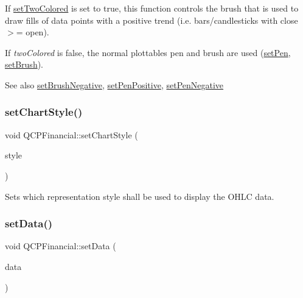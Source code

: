 If \mbox{\hyperlink{class_q_c_p_financial_a138e44aac160a17a9676652e240c5f08}{set\+Two\+Colored}} is set to true, this function controls the brush that is used to draw fills of data points with a positive trend (i.\+e. bars/candlesticks with close $>$= open).

If {\itshape two\+Colored} is false, the normal plottable\textquotesingle{}s pen and brush are used (\mbox{\hyperlink{class_q_c_p_abstract_plottable_ab74b09ae4c0e7e13142fe4b5bf46cac7}{set\+Pen}}, \mbox{\hyperlink{class_q_c_p_abstract_plottable_a7a4b92144dca6453a1f0f210e27edc74}{set\+Brush}}).

\begin{DoxySeeAlso}{See also}
\mbox{\hyperlink{class_q_c_p_financial_a8bbdd87629f9144b3ef51af660c0961a}{set\+Brush\+Negative}}, \mbox{\hyperlink{class_q_c_p_financial_ac58aa3adc7a35aab0088764b840683e5}{set\+Pen\+Positive}}, \mbox{\hyperlink{class_q_c_p_financial_afe5c07e94ccea01a75b3a2476993c346}{set\+Pen\+Negative}} 
\end{DoxySeeAlso}
\mbox{\label{class_q_c_p_financial_a5a59175d36279d71596e64d7bb65596f}} 
\subsubsection{\texorpdfstring{set\+Chart\+Style()}{setChartStyle()}}
{\footnotesize\ttfamily void Q\+C\+P\+Financial\+::set\+Chart\+Style (\begin{DoxyParamCaption}\item[{\mbox{\hyperlink{class_q_c_p_financial_a0f800e21ee98d646dfc6f8f89d10ebfb}{Q\+C\+P\+Financial\+::\+Chart\+Style}}}]{style }\end{DoxyParamCaption})}

Sets which representation style shall be used to display the O\+H\+LC data. \mbox{\label{class_q_c_p_financial_a72089e75b8a50d18097526c3c79fdb85}} 
\subsubsection{\texorpdfstring{set\+Data()}{setData()}\hspace{0.1cm}{\footnotesize\ttfamily [1/2]}}
{\footnotesize\ttfamily void Q\+C\+P\+Financial\+::set\+Data (\begin{DoxyParamCaption}\item[{Q\+Shared\+Pointer$<$ \mbox{\hyperlink{class_q_c_p_data_container}{Q\+C\+P\+Financial\+Data\+Container}} $>$}]{data }\end{DoxyParamCaption})}

